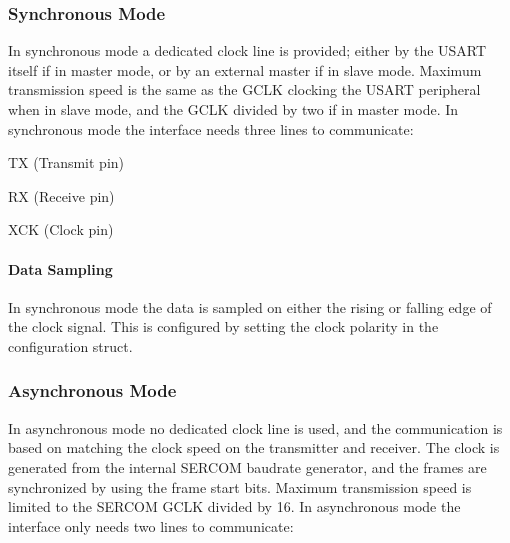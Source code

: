 \label{group__asfdoc__sam0__sercom__usart__group_asfdoc_sam0_sercom_usart_frame_diagram}%
%
\hypertarget{group__asfdoc__sam0__sercom__usart__group_asfdoc_sam0_sercom_usart_overview_sync}{}\subsubsection{Synchronous Mode}\label{group__asfdoc__sam0__sercom__usart__group_asfdoc_sam0_sercom_usart_overview_sync}
In synchronous mode a dedicated clock line is provided; either by the U\+S\+A\+RT itself if in master mode, or by an external master if in slave mode. Maximum transmission speed is the same as the G\+C\+LK clocking the U\+S\+A\+RT peripheral when in slave mode, and the G\+C\+LK divided by two if in master mode. In synchronous mode the interface needs three lines to communicate\+:
\begin{DoxyItemize}
\item TX (Transmit pin)
\item RX (Receive pin)
\item X\+CK (Clock pin)
\end{DoxyItemize}\hypertarget{group__asfdoc__sam0__sercom__usart__group_asfdoc_sam0_sercom_usart_overview_sync_sampling}{}\paragraph{Data Sampling}\label{group__asfdoc__sam0__sercom__usart__group_asfdoc_sam0_sercom_usart_overview_sync_sampling}
In synchronous mode the data is sampled on either the rising or falling edge of the clock signal. This is configured by setting the clock polarity in the configuration struct.\hypertarget{group__asfdoc__sam0__sercom__usart__group_asfdoc_sam0_sercom_usart_overview_async}{}\subsubsection{Asynchronous Mode}\label{group__asfdoc__sam0__sercom__usart__group_asfdoc_sam0_sercom_usart_overview_async}
In asynchronous mode no dedicated clock line is used, and the communication is based on matching the clock speed on the transmitter and receiver. The clock is generated from the internal S\+E\+R\+C\+OM baudrate generator, and the frames are synchronized by using the frame start bits. Maximum transmission speed is limited to the S\+E\+R\+C\+OM G\+C\+LK divided by 16. In asynchronous mode the interface only needs two lines to communicate\+:
